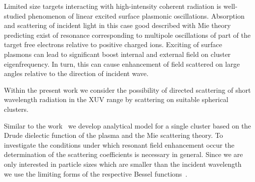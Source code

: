 \documentclass[conference]{IEEEtran}
\begin{document}
Limited size targets interacting with high-intensity coherent radiation is well-studied phenomenon of linear excited surface plasmonic oscillations. Absorption and scattering of incident light in this case good described with Mie theory predicting exist of resonance corresponding to multipole oscillations of part of the target free electrons relative to positive charged ions. Exciting of surface plasmons can lead to significant boost internal and external field on cluster eigenfrequency. In turn, this can cause enhancement of field scattered on large angles relative to the direction of incident wave.


Within the present work we consider the possibility of directed scattering of short wavelength radiation in the XUV range by scattering on suitable spherical clusters.


Similar to the work~\cite{andreev_lecz} we develop analytical model for a single cluster based on the Drude dielectic function of the plasma and the Mie scattering theory. To investigate the conditions under which resonant ﬁeld enhancement occur the determination of the scattering coeﬃcients is necessary in general. Since we are only interested in particle sizes which are smaller than the incident wavelength we use the limiting forms of the respective Bessel functions~\cite{boren_huffman}.


\end{document}
